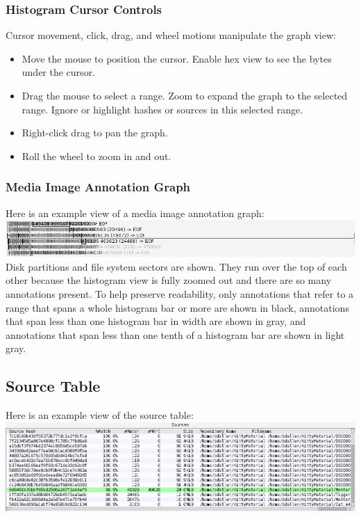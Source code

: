 \documentclass[11pt,fleqn]{article} %
\begin{document}
\subsubsection{Histogram Cursor Controls}
Cursor movement, click, drag, and wheel motions manipulate the graph view:
\begin{itemize}
\item Move the mouse to position the cursor. Enable hex view to see the bytes under the cursor.
\item Drag the mouse to select a range. Zoom to expand the graph to the selected range. Ignore or highlight hashes or sources in this selected range.
\item Right-click drag to pan the graph.
\item Roll the wheel to zoom in and out.
\end{itemize}

\subsubsection{Media Image Annotation Graph}
Here is an example view of a media image annotation graph:\\
\includegraphics[scale=.4]{screenshots/annotations}\\
Disk partitions and file system sectors are shown. They run over the top of each other because the histogram view is fully zoomed out and there are so many annotations present. To help preserve readability, only annotations that refer to a range that spans a whole histogram bar or more are shown in black, annotations that span less than one histogram bar in width are shown in gray, and annotations that span less than one tenth of a histogram bar are shown in light gray.

\subsection{Source Table}
Here is an example view of the source table:\\
\includegraphics[scale=.4]{screenshots/source_table}\\
\end{document}
